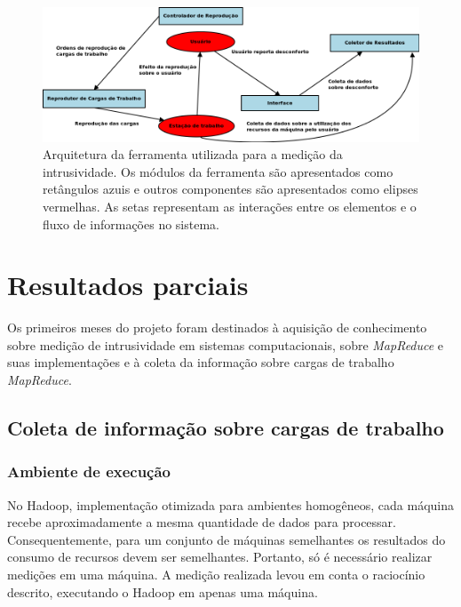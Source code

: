 \documentclass[a4paper,10pt]{article}
\begin{document}
\begin{figure}[htp]
 \includegraphics[width=17cm]{arquitetura_ferramenta.png}
 \caption{Arquitetura da ferramenta utilizada para a medição da intrusividade.
Os módulos da ferramenta são apresentados como retângulos azuis e outros
componentes são apresentados como elipses vermelhas. As setas representam as
interações entre os elementos e o fluxo de informações no sistema.}
 \label{tools_architecture}
\end{figure}

\section{Resultados parciais}
\label{resultados_parciais}

Os primeiros meses do projeto foram destinados à aquisição de conhecimento
sobre medição de intrusividade em sistemas computacionais, sobre
\textit{MapReduce} e suas implementações e à coleta da informação sobre cargas de
trabalho \textit{MapReduce}.

\subsection{Coleta de informação sobre cargas de trabalho}

\subsubsection{Ambiente de execução}

No Hadoop, implementação otimizada para ambientes homogêneos, cada
máquina recebe aproximadamente a mesma quantidade de dados para processar.
Consequentemente, para um conjunto de máquinas semelhantes os resultados do
consumo de recursos devem ser semelhantes. Portanto, só é necessário realizar
medições em uma máquina. A medição realizada levou em conta o raciocínio
descrito, executando o Hadoop em apenas uma máquina.
\end{document}
